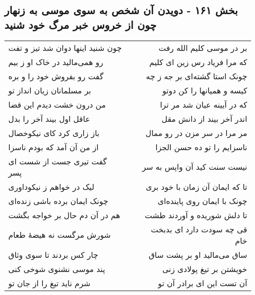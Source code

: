 \begin{center}
\section*{بخش ۱۶۱ - دویدن آن شخص به سوی موسی به زنهار چون از خروس خبر مرگ خود شنید}
\label{sec:sh161}
\begin{longtable}{l p{0.5cm} r}
چون شنید اینها دوان شد تیز و تفت
&&
بر در موسی کلیم الله رفت
\\
رو همی‌مالید در خاک او ز بیم
&&
که مرا فریاد رس زین ای کلیم
\\
گفت رو بفروش خود را و بره
&&
چونک استا گشته‌ای بر جه ز چه
\\
بر مسلمانان زیان انداز تو
&&
کیسه و همیانها را کن دوتو
\\
من درون خشت دیدم این قضا
&&
که در آیینه عیان شد مر ترا
\\
عاقل اول بیند آخر را بدل
&&
اندر آخر بیند از دانش مقل
\\
باز زاری کرد کای نیکوخصال
&&
مر مرا در سر مزن در رو ممال
\\
از من آن آمد که بودم ناسزا
&&
ناسزایم را تو ده حسن الجزا
\\
گفت تیری جست از شست ای پسر
&&
نیست سنت کید آن واپس به سر
\\
لیک در خواهم ز نیکوداوری
&&
تا که ایمان آن زمان با خود بری
\\
چونک ایمان برده باشی زنده‌ای
&&
چونک با ایمان روی پاینده‌ای
\\
هم در آن دم حال بر خواجه بگشت
&&
تا دلش شوریده و آوردند طشت
\\
شورش مرگست نه هیضهٔ طعام
&&
قی چه سودت دارد ای بدبخت خام
\\
چار کس بردند تا سوی وثاق
&&
ساق می‌مالید او بر پشت ساق
\\
پند موسی نشنوی شوخی کنی
&&
خویشتن بر تیغ پولادی زنی
\\
شرم ناید تیغ را از جان تو
&&
آن تست این ای برادر آن تو
\\
\end{longtable}
\end{center}

